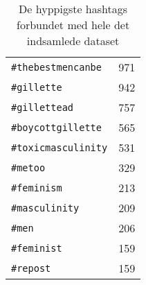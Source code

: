 \begin{table}[htpb]
\centering
\captionsetup{justification=centering,singlelinecheck=off}
\caption{
  De hyppigste hashtags forbundet med hele det indsamlede dataset
}
\begin{tabular}{lr}

\texttt{\#thebestmencanbe}  & 971 \\
\texttt{\#gillette}         & 942 \\
\texttt{\#gillettead}       & 757 \\
\texttt{\#boycottgillette}  & 565 \\
\texttt{\#toxicmasculinity} & 531 \\
\texttt{\#metoo}            & 329 \\
\texttt{\#feminism}}        & 213 \\
\texttt{\#masculinity}      & 209 \\
\texttt{\#men}              & 206 \\
\texttt{\#feminist}         & 159 \\
\texttt{\#repost}           & 159

\end{tabular}
\end{table}
